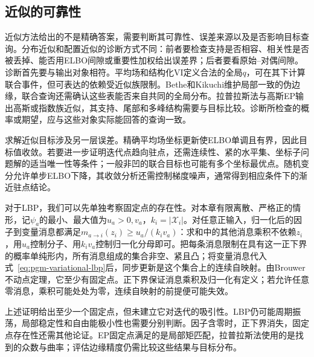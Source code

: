 \subsection{近似的可靠性}

\label{sec:pgm-variational-results-diagnostics}
\label{sec:pgm-variational-analysis}
\label{sec:pgm-variational-convergence}
\label{sec:pgm-variational-diagnostics}

近似方法给出的不是精确答案，需要判断其可靠性、误差来源以及是否影响目标查询。分布近似和配置近似的诊断方式不同：前者要检查支持是否相容、相关性是否被丢掉、能否用ELBO间隙或重要性加权给出误差界；后者要看原始--对偶间隙。诊断首先要与输出对象相符。平均场和结构化VI定义合法的全局$q$，可在其下计算联合事件，但可表达的依赖受近似族限制。Bethe和Kikuchi维护局部一致的伪边缘，联合查询还需确认这些表能否来自共同的全局分布。拉普拉斯法与高斯EP输出高斯或指数族近似，其支持、尾部和多峰结构需要与目标比较。诊断所检查的概率或期望，应与这些对象实际能回答的查询一致。

求解近似目标涉及另一层误差。精确平均场坐标更新使ELBO单调且有界，因此目标值收敛。若要进一步证明迭代点趋向驻点，还需连续性、紧的水平集、坐标子问题解的适当唯一性等条件；一般非凹的联合目标也可能有多个坐标最优点。随机变分允许单步ELBO下降，其收敛分析还需控制梯度噪声，通常得到相应条件下的渐近驻点结论。

对于LBP，我们可以先单独考察固定点的存在性。对本章有限离散、严格正的情形，记$\psi_a$的最小、最大值为$u_a>0,v_a$，$k_i=|\mathcal X_i|$。对任意正输入，归一化后的因子到变量消息都满足$m_{a\to i}(z_i)\geq u_a/(k_iv_a)$：求和中的其他消息乘积不依赖$z_i$，用$u_a$控制分子、用$k_iv_a$控制归一化分母即可。把每条消息限制在具有这一正下界的概率单纯形内，所有消息组成的集合非空、紧且凸；将变量消息代入式~\eqref{eq:pgm-variational-lbp}后，同步更新是这个集合上的连续自映射。由Brouwer不动点定理，它至少有固定点。正下界保证消息乘积及归一化有定义；若允许任意零消息，乘积可能处处为零，连续自映射的前提便可能失效。

上述证明给出至少一个固定点，但未建立它对迭代的吸引性。LBP仍可能周期振荡，局部稳定性和自由能极小性也需要分别判断。因子含零时，正下界消失，固定点存在性还需其他论证。EP固定点满足的是局部矩匹配，拉普拉斯法使用的是找到的众数与曲率；评估边缘精度仍需比较这些结果与目标分布。

